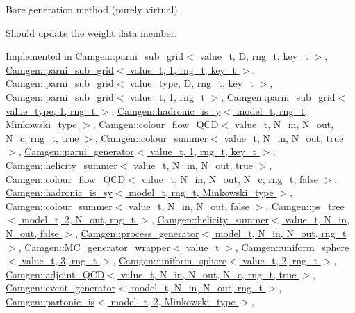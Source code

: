 \textquotesingle{}Bare generation\textquotesingle{} method (purely virtual). 

Should update the weight data member. 

Implemented in \hyperlink{a00397_a5423309febf75bf091f5eb42685eca3f}{Camgen\+::parni\+\_\+sub\+\_\+grid$<$ value\+\_\+t, D, rng\+\_\+t, key\+\_\+t $>$}, \hyperlink{a00397_a5423309febf75bf091f5eb42685eca3f}{Camgen\+::parni\+\_\+sub\+\_\+grid$<$ value\+\_\+t, 1, rng\+\_\+t, key\+\_\+t $>$}, \hyperlink{a00397_a5423309febf75bf091f5eb42685eca3f}{Camgen\+::parni\+\_\+sub\+\_\+grid$<$ value\+\_\+type, D, rng\+\_\+t, key\+\_\+t $>$}, \hyperlink{a00397_a5423309febf75bf091f5eb42685eca3f}{Camgen\+::parni\+\_\+sub\+\_\+grid$<$ value\+\_\+t, 1, rng\+\_\+t $>$}, \hyperlink{a00397_a5423309febf75bf091f5eb42685eca3f}{Camgen\+::parni\+\_\+sub\+\_\+grid$<$ value\+\_\+type, 1, rng\+\_\+t $>$}, \hyperlink{a00263_aca3cda0f673678362fbf0300fbbc3357}{Camgen\+::hadronic\+\_\+is\+\_\+y$<$ model\+\_\+t, rng\+\_\+t, Minkowski\+\_\+type $>$}, \hyperlink{a00076_a758cb255768b46448282e56ce58f5a64}{Camgen\+::colour\+\_\+flow\+\_\+\+Q\+C\+D$<$ value\+\_\+t, N\+\_\+in, N\+\_\+out, N\+\_\+c, rng\+\_\+t, true $>$}, \hyperlink{a00089_acba619ff44c605c484d747495804b2ef}{Camgen\+::colour\+\_\+summer$<$ value\+\_\+t, N\+\_\+in, N\+\_\+out, true $>$}, \hyperlink{a00394_a7d8115145c8a1d2bc2c4ca482025c8dd}{Camgen\+::parni\+\_\+generator$<$ value\+\_\+t, 1, rng\+\_\+t, key\+\_\+t $>$}, \hyperlink{a00281_a7cbb856889e174753808bfd9a57424d5}{Camgen\+::helicity\+\_\+summer$<$ value\+\_\+t, N\+\_\+in, N\+\_\+out, true $>$}, \hyperlink{a00075_ac8eda5c5f4bbba96b3d68444726dac5b}{Camgen\+::colour\+\_\+flow\+\_\+\+Q\+C\+D$<$ value\+\_\+t, N\+\_\+in, N\+\_\+out, N\+\_\+c, rng\+\_\+t, false $>$}, \hyperlink{a00259_a98f349a841c9177ead3c3d84d4262eee}{Camgen\+::hadronic\+\_\+is\+\_\+sy$<$ model\+\_\+t, rng\+\_\+t, Minkowski\+\_\+type $>$}, \hyperlink{a00088_aa137ad3cabaa0481dc78da1a2a3718d7}{Camgen\+::colour\+\_\+summer$<$ value\+\_\+t, N\+\_\+in, N\+\_\+out, false $>$}, \hyperlink{a00457_a63ea6d14274ce4584a8657c6d62d8a1e}{Camgen\+::ps\+\_\+tree$<$ model\+\_\+t, 2, N\+\_\+out, rng\+\_\+t $>$}, \hyperlink{a00280_a7230e7f5ee3f70fcd181911f2f4cf4f6}{Camgen\+::helicity\+\_\+summer$<$ value\+\_\+t, N\+\_\+in, N\+\_\+out, false $>$}, \hyperlink{a00436_a17ee544f823a680a9ab5966faf42e96a}{Camgen\+::process\+\_\+generator$<$ model\+\_\+t, N\+\_\+in, N\+\_\+out, rng\+\_\+t $>$}, \hyperlink{a00367_a5fa053a552e2022c82efc1d250f38017}{Camgen\+::\+M\+C\+\_\+generator\+\_\+wrapper$<$ value\+\_\+t $>$}, \hyperlink{a00569_a2d1d9de11dbd1832c6c3349b10547b27}{Camgen\+::uniform\+\_\+sphere$<$ value\+\_\+t, 3, rng\+\_\+t $>$}, \hyperlink{a00568_ac011c9492251c5419ec4f88ff4cf8c9a}{Camgen\+::uniform\+\_\+sphere$<$ value\+\_\+t, 2, rng\+\_\+t $>$}, \hyperlink{a00005_ab5732608de6b76d3545c9e4df43d1e5e}{Camgen\+::adjoint\+\_\+\+Q\+C\+D$<$ value\+\_\+t, N\+\_\+in, N\+\_\+out, N\+\_\+c, rng\+\_\+t, true $>$}, \hyperlink{a00212_a05eabe92d7a8c45ac8cdd75bc97055df}{Camgen\+::event\+\_\+generator$<$ model\+\_\+t, N\+\_\+in, N\+\_\+out, rng\+\_\+t $>$}, \hyperlink{a00414_a75c572d16c6a484490a70d799a24b600}{Camgen\+::partonic\+\_\+is$<$ model\+\_\+t, 2, Minkowski\+\_\+type $>$}, 